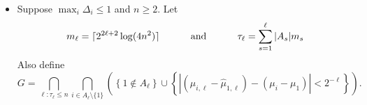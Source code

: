 \documentclass[10pt]{article}
\theoremstyle{definition}
\newenvironment{solution*}[1]{%
  \IfBlankTF{#1}
    {\renewcommand{\themanualsolutioninner}{\unskip}}
    {\renewcommand\themanualsolutioninner{#1}}%
  \manualsolutioninner
}{\endmanualsolutioninner}
\DeclarePairedDelimiter{\ceil}{\lceil}{\rceil}
\begin{document}
\begin{solution*}{}
\begin{itemize}
\begin{proof}
\begin{equation*}
                \sum_{\ell \geq 1} k \exp \left( - \frac{m_\ell 2^{-2\ell}}{4} \right) = \sum_{\ell \geq 1} k \cdot 2^{-\ell-1} \cdot \frac{1}{nk} = \frac{1}{2n}.
            \end{equation*}
            Also, $\left\{ i \in A_{i+1}\right\} \subset \left\{i \in A_{\ell_i + 1}, 1 \in A_{\ell_i}, i \in A_{\ell_i} \right\} \cup \left\{1 \notin A_{\ell_i} \right\}$ implies
            \begin{align*}
                \mathbb{P} \left[ i \in A_{i+1} \right] &\leq \mathbb{P} \left[ i \in A_{\ell_i + 1}, 1 \in A_{\ell_i}, i \in A_{\ell_i} \right] + \mathbb{P} \left[ 1 \notin A_{\ell_i} \right] \\
                &\leq \exp \left( - \frac{m_{\ell_i}\left(\Delta_i - 2^{-2\ell_i}\right)^2}{4}\right) + \mathbb{P}\left[ \exists \ell \text{ s.t. } 1 \notin A_\ell \right] \\
                &\leq \exp \left( - \frac{m_{\ell_i}\cdot \frac{\Delta_i ^2}{4}}{4} \right) + \mathbb{P}\left[ \exists \ell \text{ s.t. } 1 \notin A_\ell \right] \\
                &\leq \exp \left( - \frac{2^{2 \ell_i} \cdot \Delta_i ^2 \cdot \log(2^{\ell_i +1} \cdot nk)}{4} \right) + \frac{1}{2n} \\
                &\leq \exp \left( - \log(2^{\ell_i +1} \cdot nk) \right) + \frac{1}{2n} \\
                &\leq 2^{-\ell_i - 1} \cdot \frac{1}{nk} + \frac{1}{2n} \\
                &\leq \frac{1}{n}
            \end{align*}
            for $m_\ell = \ceil{2^{2\ell+2} \log (2^{\ell+1} \cdot nk)}$.
        \end{proof}
        \item[(d)]
        Suppose $\max_{i} \Delta_i \leq 1$ and $ n\geq 2 $.
        Let
        \begin{equation*}
            m_\ell = \ceil{2^{2\ell +2}\log(4n^2)}  \hspace{1cm} \text{ and } \hspace{1cm} \tau_\ell = \sum_{s=1}^\ell |A_s|m_s
        \end{equation*}
        Also define
        \begin{equation*}
            G = \bigcap_{\ell : \tau_\ell \leq n} \bigcap_{i\in A_\ell \setminus \{1\}} \left( \left\{ 1 \notin A_\ell \right\} \cup \left\{ |(\hat{\mu}_{i,\ell} - \hat{\mu}_{1,\ell})-(\mu_i - \mu_1)| < 2^{-\ell} \right\}\right).
        \end{equation*}

\end{itemize}
\end{solution*}
\end{document}

